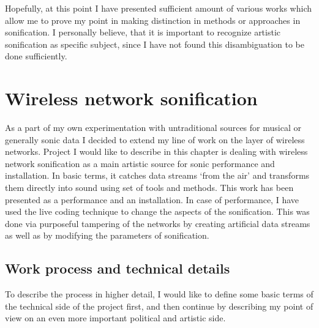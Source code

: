 \documentclass[12pt,a4paper,oneside]{report}
\begin{document}
Hopefully, at this point I have presented sufficient amount of various works which allow me to prove my point in making distinction in methods or approaches in sonification. I personally believe, that it is important to recognize artistic sonification as specific subject, since I have not found this disambiguation to be done sufficiently.

\section{Wireless network sonification}

As a part of my own experimentation with untraditional sources for musical or generally sonic data I decided to extend my line of work on the layer of wireless networks. Project I would like to describe in this chapter is dealing with wireless network sonification as a main artistic source for sonic performance and installation. In basic terms, it catches data streams `from the air' and transforms them directly into sound using set of tools and methods. This work has been presented as a performance and an installation. In case of performance, I have used the live coding technique to change the aspects of the sonification. This was done via purposeful tampering of the networks by creating artificial data streams as well as by modifying the parameters of sonification.

\subsection{Work process and technical details}

To describe the process in higher detail, I would like to define some basic terms of the technical side of the project first, and then continue by describing my point of view on an even more important political and artistic side.
\end{document}
